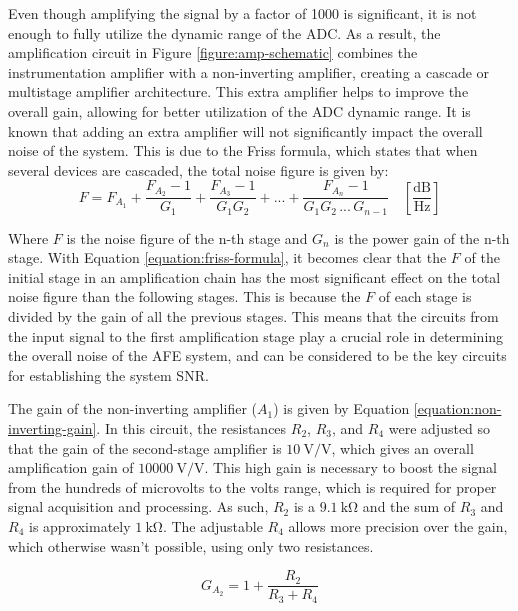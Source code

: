 Even though amplifying the signal by a factor of 1000 is significant, it is not enough to fully utilize the dynamic range of the \ac{ADC}. As a result, the amplification circuit in Figure \ref{figure:amp-schematic} combines the instrumentation amplifier with a non-inverting amplifier, creating a cascade or multistage amplifier architecture. This extra amplifier helps to improve the overall gain, allowing for better utilization of the \ac{ADC} dynamic range. It is known that adding an extra amplifier will not significantly impact the overall noise of the system. This is due to the Friss formula, which states that when several devices are cascaded, the total noise figure is given by:
\begin{equation}
     F = F_{A_1} + \frac{F_{A_2} - 1}{G_1} + \frac{F_{A_3} - 1}{G_1 G_2} + ... + \frac{F_{A_n} - 1}{G_1 G_2\,...\,G_{n-1}}  \quad \mathrm{\left[\frac{dB}{Hz}\right]}
    \label{equation:friss-formula}
\end{equation}

\noindent
Where $F$ is the noise figure of the n-th stage and $G_n$ is the power gain of the n-th stage. With Equation \ref{equation:friss-formula}, it becomes clear that the $F$ of the initial stage in an amplification chain has the most significant effect on the total noise figure than the following stages. This is because the $F$ of each stage is divided by the gain of all the previous stages. This means that the circuits from the input signal to the first amplification stage play a crucial role in determining the overall noise of the \ac{AFE} system, and can be considered to be the key circuits for establishing the system \ac{SNR}.

The gain of the non-inverting amplifier ($A_1$) is given by Equation \ref{equation:non-inverting-gain}. In this circuit, the resistances $R_2$, $R_3$, and $R_4$ were adjusted so that the gain of the second-stage amplifier is $\mathrm{10~V/V}$, which gives an overall amplification gain of $\mathrm{10000~V/V}$. This high gain is necessary to boost the signal from the hundreds of microvolts to the volts range, which is required for proper signal acquisition and processing. As such, $R_2$ is a $\mathrm{9.1~k\Omega}$ and the sum of $R_3$ and $R_4$ is approximately $\mathrm{1~k\Omega}$. The adjustable $R_4$ allows more precision over the gain, which otherwise wasn't possible, using only two resistances.

\begin{equation}
     G_{A_2} = 1 + \frac{R_2}{R_3 + R_4}
    \label{equation:non-inverting-gain}
\end{equation}

